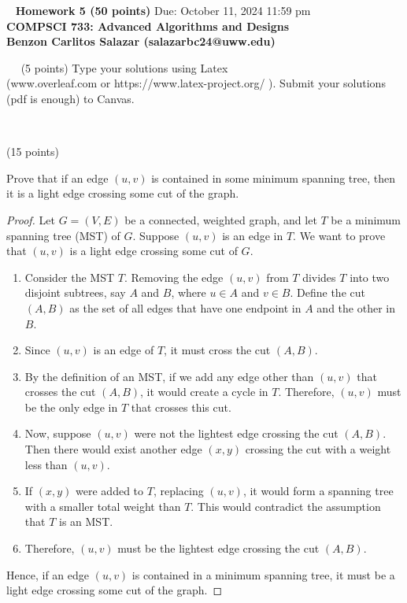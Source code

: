 \documentclass[12pt]{article}
\newcommand{\vs}{\vspace{2mm}}
\newcommand{\ls}{\vspace{5mm}}
\newcommand{\bc}{\begin{center}}
\newcommand{\ec}{\end{center}}
\begin{document}
\bc\ 
 { \bf Homework 5 (50 points) }  Due: October 11, 2024 11:59 pm\\
 { \bf COMPSCI 733: Advanced Algorithms and Designs } \\ 
 { \bf Benzon Carlitos Salazar (salazarbc24@uww.edu) } 
\ec\
\ls\
 (5 points) Type your solutions using Latex \\
(www.overleaf.com or https://www.latex-project.org/ ). Submit your solutions (pdf is enough)  to Canvas. 

\vs\

 (15 points)
\vs\

Prove that if an edge $(u,v)$ is contained in some minimum spanning tree, then it is a light edge crossing some cut of the graph.
\vs\

\begin{proof}   
    Let $G = (V, E)$ be a connected, weighted graph, and let $T$ be a minimum spanning tree (MST) of $G$. Suppose $(u, v)$ is an edge in $T$. We want to prove that $(u, v)$ is a light edge crossing some cut of $G$.

    \begin{enumerate}
        \item Consider the MST $T$. Removing the edge $(u, v)$ from $T$ divides $T$ into two disjoint subtrees, say $A$ and $B$, where $u \in A$ and $v \in B$. Define the cut $(A, B)$ as the set of all edges that have one endpoint in $A$ and the other in $B$.
        
        \item Since $(u, v)$ is an edge of $T$, it must cross the cut $(A, B)$.
        
        \item By the definition of an MST, if we add any edge other than $(u, v)$ that crosses the cut $(A, B)$, it would create a cycle in $T$. Therefore, $(u, v)$ must be the only edge in $T$ that crosses this cut.
        
        \item Now, suppose $(u, v)$ were not the lightest edge crossing the cut $(A, B)$. Then there would exist another edge $(x, y)$ crossing the cut with a weight less than $(u, v)$.
        
        \item If $(x, y)$ were added to $T$, replacing $(u, v)$, it would form a spanning tree with a smaller total weight than $T$. This would contradict the assumption that $T$ is an MST.
        
        \item Therefore, $(u, v)$ must be the lightest edge crossing the cut $(A, B)$.
    \end{enumerate}

    Hence, if an edge $(u, v)$ is contained in a minimum spanning tree, it must be a light edge crossing some cut of the graph. 
\end{proof}
\end{document}
